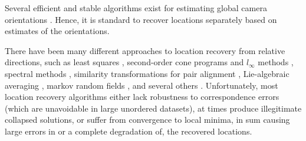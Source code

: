 Several efficient and stable algorithms exist for estimating global camera orientations \cite{1dSfm_11,1dSfm_7, 1dSfm_3, 1dSfm_18,1dSfm_8,1dSfm_19,1dSfm_13,1dSfm_5,1dSfm_10, 1dSfm_5,AMIT_13,1dSfm_17,AMIT_25}.  Hence, it is standard to recover locations separately based on estimates of the orientations.






There have been many different approaches to location recovery from relative directions, such as least squares \cite{1dSfm_11, 1dSfm_3,1dSfm_4,1dSfm_17}, second-order cone programs and $l_\infty$ methods \cite{1dSfm_16,1dSfm_17,1dSfm_18, AMIT_19,AMIT_27}, spectral methods \cite{1dSfm_4}, similarity transformations for pair alignment \cite{1dSfm_19}, Lie-algebraic averaging \cite{AMIT_13}, markov random fields \cite{1dSfm_6}, and several others \cite{1dSfm_19,AMIT_32,AMIT_25, 1dSfm_14}. Unfortunately, most location recovery algorithms either lack robustness to correspondence errors (which are unavoidable in large unordered datasets), at times produce illegitimate collapsed solutions, or suffer from convergence to local minima, in sum causing large errors in or a complete degradation of, the recovered locations.


